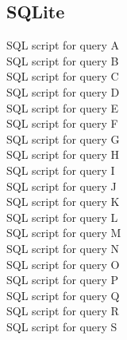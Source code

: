 \documentclass{article}
\begin{document}
\subsection*{SQLite}
{SQL script for query A} \\
{SQL script for query B} \\
{SQL script for query C} \\
{SQL script for query D} \\
{SQL script for query E} \\
{SQL script for query F} \\
{SQL script for query G} \\
{SQL script for query H} \\
{SQL script for query I} \\
{SQL script for query J} \\
{SQL script for query K} \\
{SQL script for query L} \\
{SQL script for query M} \\
{SQL script for query N} \\
{SQL script for query O} \\
{SQL script for query P} \\
{SQL script for query Q} \\
{SQL script for query R} \\
{SQL script for query S} \\
\end{document}
